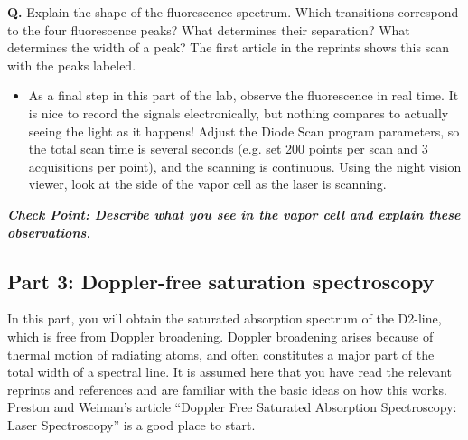 \documentclass{../lab}
\begin{document}
\textbf{Q.} Explain the shape of the fluorescence spectrum. Which transitions correspond to the four fluorescence peaks? What determines their separation? What determines the width of a peak? The first article in the reprints shows this scan with the peaks labeled.

\begin{itemize}
    \item As a final step in this part of the lab, observe the fluorescence in real time. It is nice to record the signals electronically, but nothing compares to actually seeing the light as it happens! Adjust the Diode Scan program parameters, so the total scan time is several seconds (e.g. set 200 points per scan and 3 acquisitions per point), and the scanning is continuous. Using the night vision viewer, look at the side of the vapor cell as the laser is scanning.

\end{itemize}

\emph{\textbf{Check Point: Describe what you see in the vapor cell and explain these observations.}}

\subsection{Part 3: Doppler-free saturation spectroscopy}

In this part, you will obtain the saturated absorption spectrum of the D2-line, which is free from Doppler broadening. Doppler broadening arises because of thermal motion of radiating atoms, and often constitutes a major part of the total width of a spectral line. It is assumed here that you have read the relevant reprints and references and are familiar with the basic ideas on how this works. Preston and Weiman's article ``Doppler Free Saturated Absorption Spectroscopy: Laser Spectroscopy'' is a good place to start.
\end{document}
